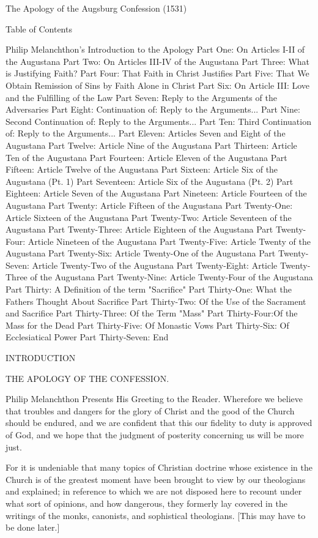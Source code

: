 The Apology of the Augsburg Confession (1531)

Table of Contents

Philip Melanchthon's Introduction to the Apology
Part One: On Articles I-II of the Augustana
Part Two: On Articles III-IV of the Augustana
Part Three: What is Justifying Faith?
Part Four: That Faith in Christ Justifies
Part Five: That We Obtain Remission of Sins by Faith Alone in Christ
Part Six: On Article III: Love and the Fulfilling of the Law
Part Seven: Reply to the Arguments of the Adversaries
Part Eight: Continuation of: Reply to the Arguments...
Part Nine: Second Continuation of: Reply to the Arguments...
Part Ten: Third Continuation of: Reply to the Arguments...
Part Eleven: Articles Seven and Eight of the Augustana
Part Twelve: Article Nine of the Augustana
Part Thirteen: Article Ten of the Augustana
Part Fourteen: Article Eleven of the Augustana
Part Fifteen: Article Twelve of the Augustana
Part Sixteen: Article Six of the Augustana (Pt. 1)
Part Seventeen: Article Six of the Augustana (Pt. 2)
Part Eighteen: Article Seven of the Augustana
Part Nineteen: Article Fourteen of the Augustana
Part Twenty: Article Fifteen of the Augustana
Part Twenty-One: Article Sixteen of the Augustana
Part Twenty-Two: Article Seventeen of the Augustana
Part Twenty-Three: Article Eighteen of the Augustana
Part Twenty-Four: Article Nineteen of the Augustana
Part Twenty-Five: Article Twenty of the Augustana
Part Twenty-Six: Article Twenty-One of the Augustana
Part Twenty-Seven: Article Twenty-Two of the Augustana
Part Twenty-Eight: Article Twenty-Three of the Augustana
Part Twenty-Nine: Article Twenty-Four of the Augustana
Part Thirty: A Definition of the term "Sacrifice"
Part Thirty-One: What the Fathers Thought About Sacrifice
Part Thirty-Two: Of the Use of the Sacrament and Sacrifice
Part Thirty-Three: Of the Term "Mass"
Part Thirty-Four:Of the Mass for the Dead
Part Thirty-Five: Of Monastic Vows
Part Thirty-Six: Of Ecclesiatical Power
Part Thirty-Seven: End


INTRODUCTION


THE APOLOGY OF THE CONFESSION.

Philip Melanchthon Presents His Greeting to the Reader.  Wherefore we
believe that troubles and dangers for the glory of Christ and the
good of the Church should be endured, and we are confident that this
our fidelity to duty is approved of God, and we hope that the
judgment of posterity concerning us will be more just.

For it is undeniable that many topics of Christian doctrine whose
existence in the Church is of the greatest moment have been brought
to view by our theologians and explained; in reference to which we
are not disposed here to recount under what sort of opinions, and how
dangerous, they formerly lay covered in the writings of the monks,
canonists, and sophistical theologians.  [This may have to be done
later.]

